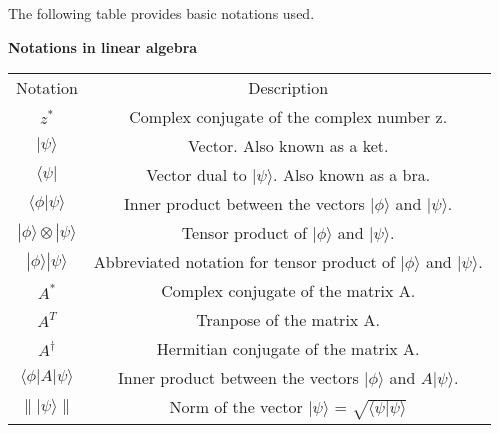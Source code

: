 The following table provides basic notations used.
\begin{center}
{ \bf Notations in linear algebra} 
\begin{tabular}{||c|c||}
\hline
Notation & Description\\
{$z^*$} & Complex conjugate of the complex number z.\\
{$| \psi \rangle$} & Vector. Also known as a ket.\\
{$\langle \psi |$} & Vector dual to {$| \psi \rangle$}. Also known as a bra.\\
{$ \langle \phi | \psi \rangle$} & Inner product between the vectors {$| \phi \rangle$} and {$| \psi \rangle$}.\\
{$| \phi \rangle \otimes | \psi \rangle $} & Tensor product of {$| \phi \rangle$} and {$| \psi \rangle$}.\\
{$| \phi \rangle | \psi \rangle $} & Abbreviated notation for tensor product of {$| \phi \rangle$} and {$| \psi \rangle$}.\\
{$A^*$} & Complex conjugate of the matrix A.\\
{$A^T$} & Tranpose of the matrix A.\\
{$A^{\dagger}$} & Hermitian conjugate of the matrix A.\\
{$ \langle \phi |A| \psi \rangle$} & Inner product between the vectors {$| \phi \rangle$} and {$A| \psi \rangle$}.\\
{$\| | \psi \rangle \|$} & Norm of the vector {$| \psi \rangle$} = {$\sqrt{\langle \psi | \psi \rangle}$}\\
\hline
\end{tabular}
\end{center}
\newpage
